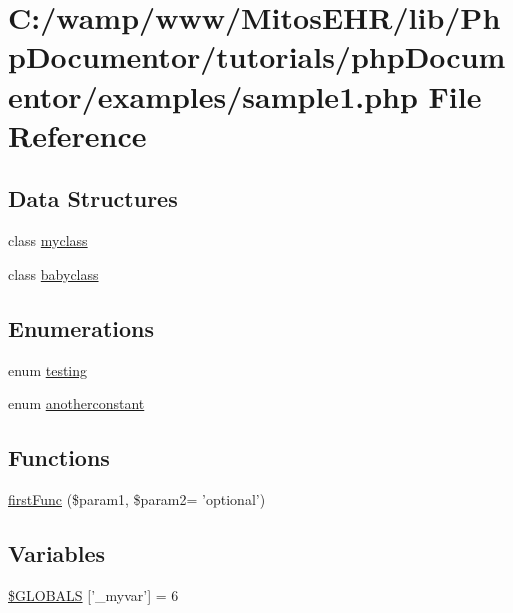\hypertarget{sample1_8php}{\section{\-C\-:/wamp/www/\-Mitos\-E\-H\-R/lib/\-Php\-Documentor/tutorials/php\-Documentor/examples/sample1.php \-File \-Reference}
\label{sample1_8php}
}
\subsection*{\-Data \-Structures}
\begin{DoxyCompactItemize}
\item 
class \hyperlink{classmyclass}{myclass}
\item 
class \hyperlink{classbabyclass}{babyclass}
\end{DoxyCompactItemize}
\subsection*{\-Enumerations}
\begin{DoxyCompactItemize}
\item 
enum \hyperlink{sample1_8php_ac82209ce53117ea2ba2b79898a0ee1ac}{testing} 
\item 
enum \hyperlink{sample1_8php_a17394f69f82ef325519c9b555be51022}{anotherconstant} 
\end{DoxyCompactItemize}
\subsection*{\-Functions}
\begin{DoxyCompactItemize}
\item 
\hyperlink{sample1_8php_a940871f540cce07fe3de81b5b43dc8df}{first\-Func} (\$param1, \$param2= 'optional')
\end{DoxyCompactItemize}
\subsection*{\-Variables}
\begin{DoxyCompactItemize}
\item 
\hyperlink{sample1_8php_af57fd0dc3f93457714d80dc8f32477a3}{\$\-G\-L\-O\-B\-A\-L\-S} \mbox{[}'\-\_\-myvar'\mbox{]} = 6
\end{DoxyCompactItemize}



